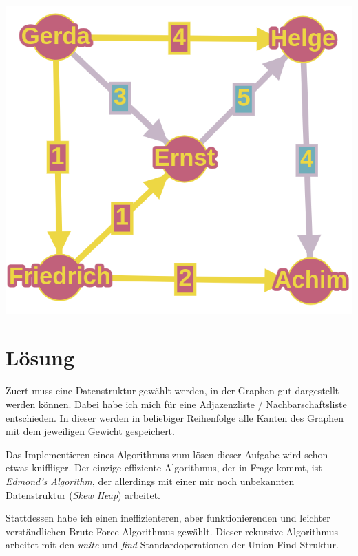 \documentclass[12pt]{scrartcl}
\begin{document}
    \vspace{12pt}
    \begin{center}
      \includegraphics[scale=0.2]{graph_solved}
    \end{center}


  \section{L{\"o}sung}
    Zuert muss eine Datenstruktur gew{\"a}hlt werden, in der Graphen gut dargestellt werden k{\"o}nnen. Dabei habe ich mich f{\"u}r eine Adjazenzliste / Nachbarschaftsliste entschieden. In dieser werden in beliebiger Reihenfolge alle Kanten des Graphen mit dem jeweiligen Gewicht gespeichert.

    \vspace{12pt}\noindent
    Das Implementieren eines Algorithmus zum l{\"o}sen dieser Aufgabe wird schon etwas kniffliger. Der einzige effiziente Algorithmus, der in Frage kommt, ist \textit{Edmond's Algorithm}, der allerdings mit einer mir noch unbekannten Datenstruktur (\textit{Skew Heap}) arbeitet.

    \vspace{12pt}\noindent
    Stattdessen habe ich einen ineffizienteren, aber funktionierenden und leichter verst{\"a}ndlichen Brute Force Algorithmus gew{\"a}hlt. Dieser rekursive Algorithmus arbeitet mit den \textit{unite} und \textit{find} Standardoperationen der Union-Find-Struktur.

    \vspace{12pt}\noindent
  
\end{document}

